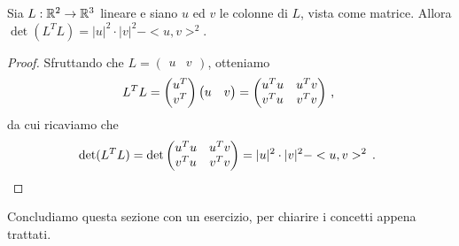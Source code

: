 \begin{lemma}
	Sia $L:\mathbb R^2\to\mathbb R^3$ lineare e siano $u$ ed $v$ le colonne di $L$, vista come matrice. Allora $\det(L^TL)=\lvert u\rvert^2\cdot\lvert v \rvert^2- <u,v>^2$.
\end{lemma}
\begin{proof}
	Sfruttando che $L=\begin{pmatrix}u& v\end{pmatrix}$, otteniamo
	\begin{equation*}
		L^TL=\begin{pmatrix}u^T\\v^T\end{pmatrix}\begin{pmatrix}u&v\end{pmatrix}=\begin{pmatrix}
		                                                                         	u^Tu & u^Tv\\
		                                                                         	v^Tu & v^Tv
		                                                                         \end{pmatrix}\, \text{, }
	\end{equation*}
	da cui ricaviamo che
	\begin{equation*}
		\det(L^TL)=\det\begin{pmatrix}u^Tu & u^Tv\\v^Tu & v^Tv\end{pmatrix}=\lvert u \rvert^2\cdot \lvert v \rvert^2-<u,v>^2\, \text{. }
	\end{equation*}
\end{proof}


Concludiamo questa sezione con un esercizio, per chiarire i concetti appena trattati.


